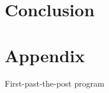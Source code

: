 \section{Conclusion}





%





%

\pagebreak

\printbibliography


\section{Appendix}
First-past-the-post program




